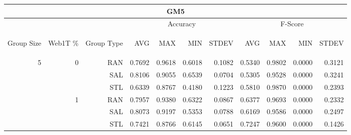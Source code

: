 \begin{center}
\begin{table}[htbp] 
 \begin{center}
\begin{tabular}{ | r | r | r | r | r | r | r | r | r | r | r |}
\hline
\multicolumn{11}{|c|}{GM5}\\
\hline
 & & & \multicolumn{4}{|c|}{Accuracy} & \multicolumn{4}{|c|}{F-Score}\\ \cline{4-11}
\begin{sideways}Group Size\end{sideways} & \begin{sideways}Web1T \%\end{sideways} & \begin{sideways}Group Type\end{sideways} & \begin{sideways}AVG\end{sideways} & \begin{sideways}MAX\end{sideways} & \begin{sideways}MIN\end{sideways} & \begin{sideways}STDEV\end{sideways} & \begin{sideways}AVG\end{sideways} & \begin{sideways}MAX\end{sideways} & \begin{sideways}MIN\end{sideways} & \begin{sideways}STDEV\end{sideways}\\
\hline
\multirow{18}{*}{5}
 & \multirow{3}{*}{0} & RAN & 0.7692 & 0.9618 & 0.6018 & 0.1082 & 0.5340 & 0.9802 & 0.0000 & 0.3121\\ \cline{3-11}
 &   & SAL & 0.8106 & 0.9055 & 0.6539 & 0.0704 & 0.5305 & 0.9528 & 0.0000 & 0.3241\\ \cline{3-11}
 &   & STL & 0.6339 & 0.8767 & 0.4180 & 0.1223 & 0.5810 & 0.9870 & 0.0000 & 0.2393\\ \cline{2-11}
 & \multirow{3}{*}{1} & RAN & 0.7957 & 0.9380 & 0.6322 & 0.0867 & 0.6377 & 0.9693 & 0.0000 & 0.2332\\ \cline{3-11}
 &   & SAL & 0.8073 & 0.9197 & 0.5353 & 0.0788 & 0.6169 & 0.9586 & 0.0000 & 0.2497\\ \cline{3-11}
 &   & STL & 0.7421 & 0.8766 & 0.6145 & 0.0651 & 0.7247 & 0.9600 & 0.0000 & 0.1426\\ \cline{2-11}

\end{tabular}
\end{center}
\end{table}
\end{center}
